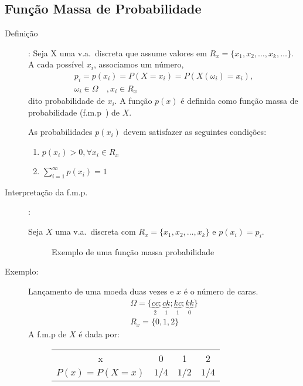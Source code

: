    \subsection{Função Massa de Probabilidade} 
   \begin{description}
     \item [Definição]: Seja X uma v.a.\ discreta que assume valores em $R_{x}=\{x_1,x_2,\dots,
       x_{k},\dots\}$. A cada possível $x_{i}$, associamos um número, 
       \begin{align*}
         p_{i}=p(x_{i})=P(X=x_{i})=P(X( \omega_i)=x_i),\\
         \omega_{i} \in \Omega \quad , x_{i} \in R_{x} \nonumber
       \end{align*}
       dito probabilidade de $x_{i}$. A função $p(x)$ é definida como função massa de probabilidade 
       (f.m.p\ ) de $X$. 

       As probabilidades $p(x_i)$ devem satisfazer as seguintes condições: 
       \begin{enumerate}[label=(\roman*)]
         \item $p(x_i)>0, \forall x_i \in R_{x}$

         \item $\sum^\infty_{i=1} p(x_i)=1$
       \end{enumerate}
     \item [Interpretação da f.m.p.\ ]: 

       Seja $X$ uma v.a.\ discreta com $R_{x}= \{x_1,x_2,\dots,x_k \}$ e $p(x_i)=p_i$.
       \begin{figure}[H]
         \centering
         
         \caption{Exemplo de uma função massa probabilidade}
         \label{fig:24}
       \end{figure}

     \item [Exemplo:] Lançamento de uma moeda duas vezes e $x$ é o número de caras.
       \begin{align*}
         \Omega = \{ \underbrace{cc}_{2}; \underbrace{ck}_{1};\underbrace{kc}_{1};\underbrace{kk}_{0} \} \\
         R_{x}= \{0,1,2\}
       \end{align*}
       A f.m.p de $X$ é dada por: 
       \begin{figure} [H]
         \centering
         \begin{tabular}{ c c c c}
           \toprule
           x &0&1&2 \\ \cmidrule{1-4}
           $P(x)=P(X=x)$&$1/4$&$1/2$& $1/4$\\    \bottomrule
         \end{tabular}
         \label{tab:4}
       \end{figure}



\end{description}
